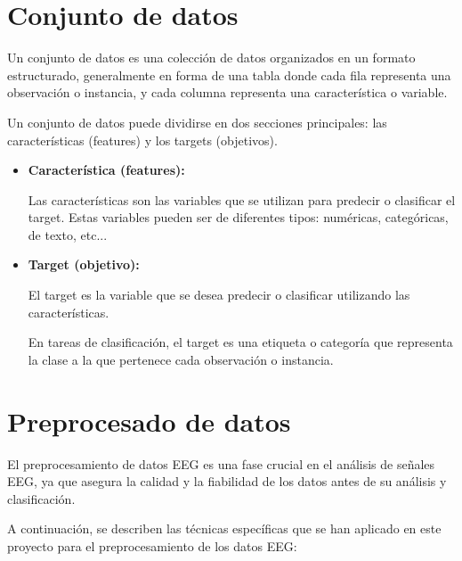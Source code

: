 \section{Conjunto de datos}

	Un conjunto de datos es una colección de datos organizados en un formato estructurado, generalmente en forma de una tabla donde cada fila representa una observación o instancia, y cada columna representa una característica o variable.
	
	Un conjunto de datos puede dividirse en dos secciones principales: las características (features) y los targets (objetivos).
	
	\begin{itemize}
	
	\item
	\textbf{Característica (features):}
	
	Las características son las variables que se utilizan para predecir o clasificar el target. 
	Estas variables pueden ser de diferentes tipos: numéricas, categóricas, de texto, etc... 
	
	\item
	\textbf{Target (objetivo):}
		
	El target es la variable que se desea predecir o clasificar utilizando las características. 
	
	En tareas de clasificación, el target es una etiqueta o categoría que representa la clase a la que pertenece cada observación o instancia.



	\end{itemize}	



\section{Preprocesado de datos}

	El preprocesamiento de datos EEG es una fase crucial en el análisis de señales EEG, ya que asegura la calidad y la fiabilidad de los datos antes de su análisis y clasificación. 
	
	A continuación, se describen las técnicas específicas que se han aplicado en este proyecto para el preprocesamiento de los datos EEG:

